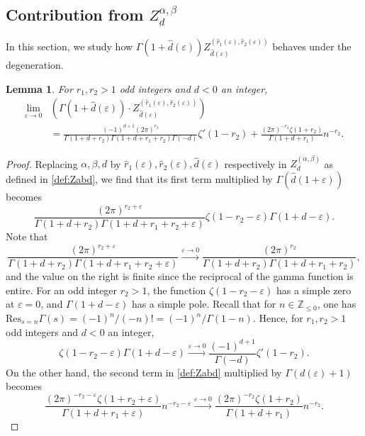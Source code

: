 \documentclass[]{article}
\newtheorem{lemma}[thm]{Lemma}
\begin{document}
\subsection{Contribution from $Z^{\alpha, \beta}_d$}
In this section, we study how $ \Gamma(1+\hat d(\varepsilon)) Z^{(\hat r_1(\varepsilon),\hat r_2(\varepsilon))}_{\hat d(\varepsilon)}$ behaves under the degeneration. 
\begin{lemma} For $r_1,r_2>1$ odd integers and $d<0 $ an integer, 
\begin{align}
\lim_{\varepsilon\to 0}&\left(\Gamma(1+\hat d(\varepsilon)) \cdot Z^{(\hat r_1(\varepsilon),\hat r_2(\varepsilon))}_{\hat d(\varepsilon)}\right)\nonumber\\ &= 
  \frac{(-1)^{d+1} (2 \pi )^{r_2} }{\Gamma (1+d+r_2) \Gamma (1+d+r_1+r_2 ) \Gamma(-d) } \zeta'(1-r_2) + \frac{(2 \pi )^{-r_2} \zeta (1+r_2 )}{\Gamma (1+d+r_1 )} n^{-r_2}.
\end{align}
\end{lemma}
\begin{proof}
Replacing \(\alpha, \beta, d\) by \(\hat r_1(\varepsilon), \hat r_2(\varepsilon),\hat d(\varepsilon)\) respectively in $Z^{(\alpha,\beta)}_d$ as defined in \eqref{def:Zabd}, we find that its first term multiplied by \(\Gamma(\hat d(1+\varepsilon))\) becomes 
\begin{equation}
\frac{(2 \pi )^{r_2+\varepsilon} }{\Gamma (1+d+r_2) \Gamma (1+d+r_1+r_2+\varepsilon )} \zeta (1-r_2-\varepsilon ) \Gamma \left(1+d -\varepsilon\right).
\end{equation}
Note that 
\begin{equation}
  \frac{(2 \pi )^{r_2+\varepsilon} }{\Gamma (1+d+r_2) \Gamma (1+d+r_1+r_2+\varepsilon )} 
  \stackrel{\varepsilon \to 0}{\to}
  \frac{(2 \pi )^{r_2} }{\Gamma (1+d+r_2) \Gamma (1+d+r_1+r_2 )} ,
\end{equation}
and the value on the right is finite since the reciprocal of the gamma function is entire. 
For an odd integer $r_2>1$, the function $   \zeta (1-r_2-\varepsilon)$ has a simple zero at $\varepsilon = 0$, and $\Gamma \left(1+d -\varepsilon\right)$ has a simple pole. Recall that for $n\in\mathbb{Z}_{\leq 0}$, one has  $\text{Res}_{s=n}\Gamma(s) = (-1)^n/(-n)! = (-1)^n / \Gamma(1-n)$. Hence, for $r_1,r_2>1$ odd integers and $d<0 $ an integer,
\begin{equation}
   \zeta (1-r_2-\varepsilon ) \Gamma \left(1+d -\varepsilon\right)
    \stackrel{ \varepsilon \to 0  }{\to} 
    \frac{  (-1)^{d+1}  }{    \Gamma(-d)}    \zeta'(1-r_2).
\end{equation}
On the other hand, the second term in \eqref{def:Zabd} multiplied by $\Gamma(d(\varepsilon)+1)$ becomes 
\begin{equation}
\frac{(2 \pi )^{-r_2-\varepsilon } \zeta (1+r_2+\varepsilon )}{\Gamma (1+d+r_1+\varepsilon )}  n^{-r_2-\varepsilon} \stackrel{  \varepsilon \to 0   }{\to} \frac{(2 \pi )^{-r_2} \zeta (1+r_2 )}{\Gamma (1+d+r_1 )} n^{-r_2}.
\end{equation}
\end{proof}
\end{document}
